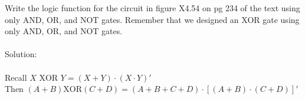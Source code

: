 Write the logic function for the circuit in figure X4.54 on pg 234 of the text using only AND, OR, and NOT gates.  Remember that we designed an XOR gate using only AND, OR, and NOT gates.\\ \\

Solution: \\ \\
Recall $X \textrm{ XOR } Y = (X + Y) \cdot (X \cdot Y)'$\\
Then $(A + B) \textrm{XOR} (C + D) = (A + B + C + D) \cdot [(A + B) \cdot (C + D)]'$
